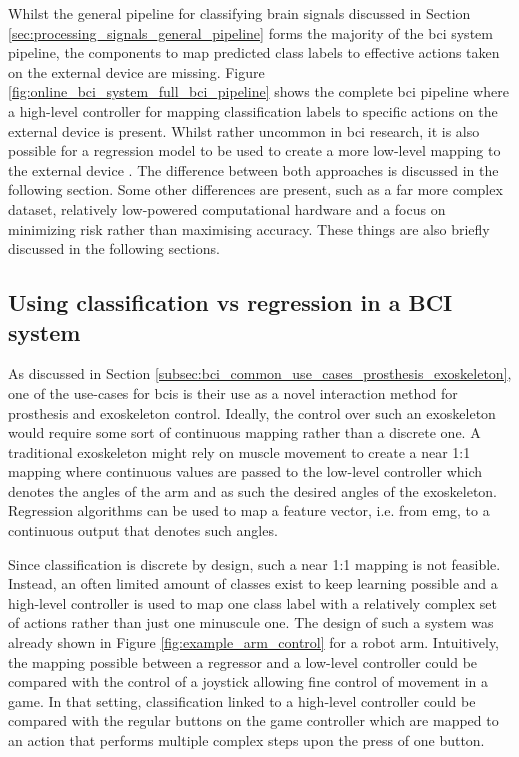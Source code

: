 Whilst the general pipeline for classifying brain signals discussed in Section \ref{sec:processing_signals_general_pipeline} forms the majority of the \gls{bci} system pipeline, the components to map predicted class labels to effective actions taken on the external device are missing.
Figure \ref{fig:online_bci_system_full_bci_pipeline} shows the complete \gls{bci} pipeline where a high-level controller for mapping classification labels to specific actions on the external device is present.
Whilst rather uncommon in \gls{bci} research, it is also possible for a regression model to be used to create a more low-level mapping to the external device \citep{bci_review_arnau}.
The difference between both approaches is discussed in the following section.
Some other differences are present, such as a far more complex dataset, relatively low-powered computational hardware and a focus on minimizing risk rather than maximising accuracy.
These things are also briefly discussed in the following sections.


\subsection{Using classification vs regression in a BCI system}
\label{subsec:online_bci_system_different_goal_classi_vs_reg} 

As discussed in Section \ref{subsec:bci_common_use_cases_prosthesis_exoskeleton}, one of the use-cases for \glspl{bci} is their use as a novel interaction method for prosthesis and exoskeleton control.
Ideally, the control over such an exoskeleton would require some sort of continuous mapping rather than a discrete one.
A traditional exoskeleton might rely on muscle movement to create a near 1:1 mapping where continuous values are passed to the low-level controller which denotes the angles of the arm and as such the desired angles of the exoskeleton.
Regression algorithms can be used to map a feature vector, i.e. from \gls{emg}, to a continuous output that denotes such angles.

Since classification is discrete by design, such a near 1:1 mapping is not feasible.
Instead, an often limited amount of classes exist to keep learning possible and a high-level controller is used to map one class label with a relatively complex set of actions rather than just one minuscule one.
The design of such a system was already shown in Figure \ref{fig:example_arm_control} for a robot arm.
Intuitively, the mapping possible between a regressor and a low-level controller could be compared with the control of a joystick allowing fine control of movement in a game.
In that setting, classification linked to a high-level controller could be compared with the regular buttons on the game controller which are mapped to an action that performs multiple complex steps upon the press of one button.

